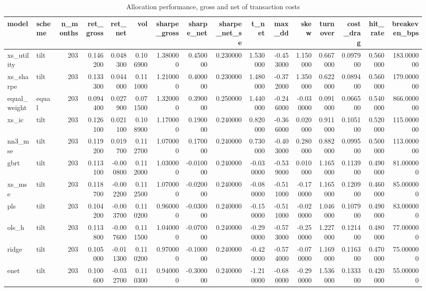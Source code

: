 \begin{table}
\caption{Allocation performance, gross and net of transaction costs}
\label{tab:t2_economic}
\begin{tabular}{llrrrrrrrrrrrrrr}
\toprule
model & scheme & n\_months & ret\_gross & ret\_net & vol & sharpe\_gross & sharpe\_net & sharpe\_net\_se & t\_net & max\_dd & skew & turnover & cost\_drag & hit\_rate & breakeven\_bps \\
\midrule
xs\_utility & tilt & 203 & 0.146200 & 0.048300 & 0.106900 & 1.380000 & 0.450000 & 0.230000 & 1.530000 & -0.453000 & 1.150000 & 0.667000 & 0.097900 & 0.560000 & 183.000000 \\
xs\_sharpe & tilt & 203 & 0.133300 & 0.044000 & 0.111000 & 1.210000 & 0.400000 & 0.230000 & 1.480000 & -0.372000 & 1.350000 & 0.622000 & 0.089400 & 0.560000 & 179.000000 \\
equal\_weight & equal & 203 & 0.094400 & 0.027900 & 0.071500 & 1.320000 & 0.390000 & 0.250000 & 1.440000 & -0.246000 & -0.030000 & 0.091000 & 0.066500 & 0.540000 & 866.000000 \\
xs\_ic & tilt & 203 & 0.126100 & 0.021100 & 0.108900 & 1.170000 & 0.190000 & 0.240000 & 0.820000 & -0.366000 & 0.020000 & 0.911000 & 0.105100 & 0.520000 & 115.000000 \\
nn3\_mse & tilt & 203 & 0.119200 & 0.019700 & 0.112700 & 1.070000 & 0.170000 & 0.240000 & 0.730000 & -0.403000 & 0.280000 & 0.882000 & 0.099500 & 0.500000 & 113.000000 \\
gbrt & tilt & 203 & 0.113100 & -0.000800 & 0.112000 & 1.030000 & -0.010000 & 0.240000 & -0.030000 & -0.539000 & 0.010000 & 1.165000 & 0.113900 & 0.490000 & 81.000000 \\
xs\_mse & tilt & 203 & 0.118700 & -0.002200 & 0.112500 & 1.070000 & -0.020000 & 0.240000 & -0.080000 & -0.511000 & -0.170000 & 1.165000 & 0.120900 & 0.460000 & 85.000000 \\
pls & tilt & 203 & 0.104200 & -0.003700 & 0.110200 & 0.960000 & -0.030000 & 0.240000 & -0.150000 & -0.511000 & -0.020000 & 1.046000 & 0.107900 & 0.490000 & 83.000000 \\
ols\_h & tilt & 203 & 0.113800 & -0.007600 & 0.111500 & 1.040000 & -0.070000 & 0.240000 & -0.290000 & -0.573000 & -0.250000 & 1.227000 & 0.121400 & 0.480000 & 77.000000 \\
ridge & tilt & 203 & 0.105000 & -0.011300 & 0.110200 & 0.970000 & -0.100000 & 0.240000 & -0.420000 & -0.574000 & -0.070000 & 1.169000 & 0.116300 & 0.470000 & 75.000000 \\
enet & tilt & 203 & 0.100600 & -0.032700 & 0.110300 & 0.940000 & -0.300000 & 0.240000 & -1.210000 & -0.680000 & -0.290000 & 1.536000 & 0.133300 & 0.420000 & 55.000000 \\
\bottomrule
\end{tabular}
\end{table}
